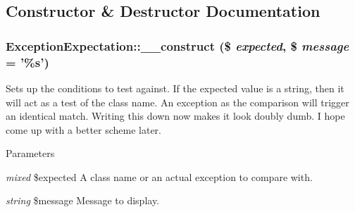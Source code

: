 \subsection{Constructor \& Destructor Documentation}
\hypertarget{class_exception_expectation_a98ec83b769c415a3d29c800665a07c8f}{
\subsubsection[{\_\-\_\-construct}]{\setlength{\rightskip}{0pt plus 5cm}ExceptionExpectation::\_\-\_\-construct (\$ {\em expected}, \/  \$ {\em message} = {\ttfamily '\%s'})}}
\label{class_exception_expectation_a98ec83b769c415a3d29c800665a07c8f}
Sets up the conditions to test against. If the expected value is a string, then it will act as a test of the class name. An exception as the comparison will trigger an identical match. Writing this down now makes it look doubly dumb. I hope come up with a better scheme later. 
\begin{DoxyParams}{Parameters}
\item[{\em mixed}]\$expected A class name or an actual exception to compare with. \item[{\em string}]\$message Message to display. \end{DoxyParams}


